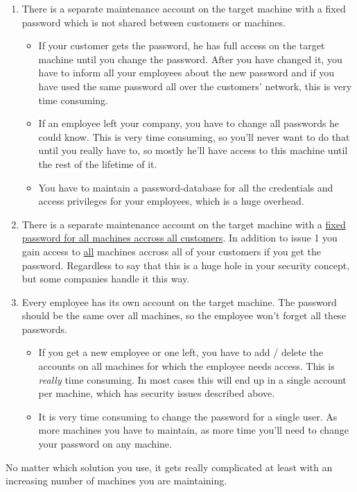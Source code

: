 \begin{enumerate}
	\item There is a separate maintenance account on the target machine with a
		fixed password which is not shared between customers or machines.
		\begin{itemize}
			\item If your customer gets the password, he has full access on the
				target machine until you change the password. After you have
				changed it, you have to inform all your employees about the new
				password and if you have used the same password all over the
				customers' network, this is very time consuming.
			\item If an employee left your company, you have to change all
				passwords he could know. This is very time consuming, so you'll
				never want to do that until you really have to, so mostly he'll
				have access to this machine until the rest of the lifetime of
				it.
			\item You have to maintain a password-database for all the
				credentials and access privileges for your employees, which is a
				huge overhead.
		\end{itemize}

	\item There is a separate maintenance account on the target machine with a
		\ul{fixed password for all machines accross all customers}. In addition
		to issue 1 you gain access to \ul{all} machines accross all of your
		customers if you get the password. Regardless to say that this is a huge
		hole in your security concept, but some companies handle it this way.

	\item Every employee has its own account on the target machine. The
		password should be the same over all machines, so the employee won't
		forget all these passwords.
		\begin{itemize}
			\item If you get a new employee or one left, you have to add /
				delete the accounts on all machines for which the employee needs
				access. This is \textit{really} time consuming. In most cases
				this will end up in a single account per machine, which has
				security issues described above.
			\item It is very time consuming to change the password for a single
				user. As more machines you have to maintain, as more time you'll
				need to change your password on any machine.
		\end{itemize}
\end{enumerate}

No matter which solution you use, it gets really complicated at least with an
increasing number of machines you are maintaining.
